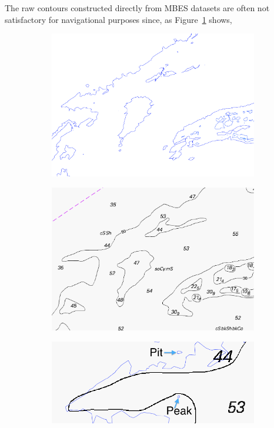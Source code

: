 The raw contours constructed directly from MBES datasets are often not satisfactory for navigational purposes since, as Figure~\ref{fig:raw} shows,
\begin{figure}
  \centering
  \begin{subfigure}[b]{0.45\linewidth}
    \centering
    \includegraphics[width=\textwidth]{figs/raw.pdf}
    \caption{}\label{fig:raw}
  \end{subfigure}%
  \begin{subfigure}[b]{0.45\linewidth}
    \centering
    \includegraphics[width=\textwidth]{figs/maponly.pdf}
    \caption{}\label{fig:ideal}
  \end{subfigure}
  \begin{subfigure}[b]{0.45\linewidth}
    \centering
    \includegraphics[width=\textwidth]{figs/smoothinAndOmission.png}

\end{subfigure}
\end{figure}
